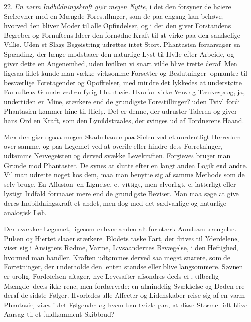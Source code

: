 \documentclass[12pt,a4paper]{article}
\newcommand{\opage}[1]{\marginnote{\footnotesize\textit{[#1]}}}
\begin{document}
22. \emph{En varm Indbildningskraft giør megen Nytte,} i det den forsyner de høiere
Sieleevner med en Mængde Forestillinger, som de paa engang kan behøve; hvorved den bliver
Moder til alle Opfindelser, og i det den giver Forstandens Begreber og Fornuftens Ideer
den fornødne Kraft til at virke paa den sandselige Villie. Uden et Slags Begeistring
udrettes intet Stort. Phantasien foraarsager en Spænding, der længe modstaaer den
naturlige Lyst til Hvile efter Arbeide, og giver dette en Angenemhed, uden hvilken vi
snart vilde blive trette deraf. Men ligesaa lidet kunde man vække virksomme Forsetter og
Beslutninger, opmuntre til besværlige Foretagender og Opoffrelser, med mindre det
lykkedes at understøtte Fornuftens Grunde ved en fyrig Phantasie. Hvorfor virke Vers og
Tænkesprog, ja, undertiden en Mine, stærkere end de grundigste Forestillinger? uden Tvivl
fordi Phantasien kommer hine til Hielp. Det er denne, der udruster Taleren og giver hans
Ord en Kraft, som den Lynildstraales, der svinges ud af Tordnerens Haand.

Men den giør ogsaa megen Skade baade paa Sielen ved et uordentligt Herredom over samme,
og paa Legemet ved at overile eller hindre dets Forretninger, udtømme Nervegeisten og
derved svække Levekraften. Forgieves bruger man Grunde mod Phantaster. De
\opage{137} synes at slutte efter en langt anden Logik end andre. Vil man udrette noget hos dem, maa
man benytte sig af samme Methode som de selv bruge. En Allusion, en Lignelse, et vittigt,
men alvorligt, ei latterligt eller lystigt Indfald formaaer mere end de grundigste
Beviser. Man maa søge at give deres Indbildningskraft et andet, men dog med det
sædvanlige og naturlige analogisk Løb.

Den svækker Legemet, ligesom enhver anden alt for stærk Aandsanstrængelse. Pulsen og
Hiertet slaaer stærkere, Blodets raske Fart, der drives til Yderdelene, viser sig i
Ansigtets Rødme, Varme, Livsaandernes Bevægelse, i den Heftighed, hvormed man handler.
Kraften udtømmes derved saa meget snarere, som de Forretninger, der underholde den, enten
standse eller blive langsommere. Søvnen er urolig, Fordøielsen aftager, nye Levesafter
afsondres deels ei i tilbørlig Mængde, deels ikke rene, men fordærvede: en almindelig
Svækkelse og Døden ere deraf de sidste Følger. Hvorledes alle Affecter og Lidenskaber
reise sig af en varm Phantasie, vises i det Følgende: og hvem kan tvivle paa, at disse
Storme tidt blive Aarsag til et fuldkomment Skibbrud?
\end{document}
